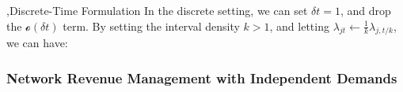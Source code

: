\documentclass[10pt]{report}
\begin{document}
\sep{Discrete-Time Formulation}
In the discrete setting, we can set $\delta t=1$, and drop the $\mathcal{o}(\delta t)$ term. By setting the interval density $k>1$, and letting $\lambda_{jt}\leftarrow\frac1k\lambda_{j,t/k}$, we can have:

\subsubsection{Network Revenue Management with Independent Demands}
\end{document}
